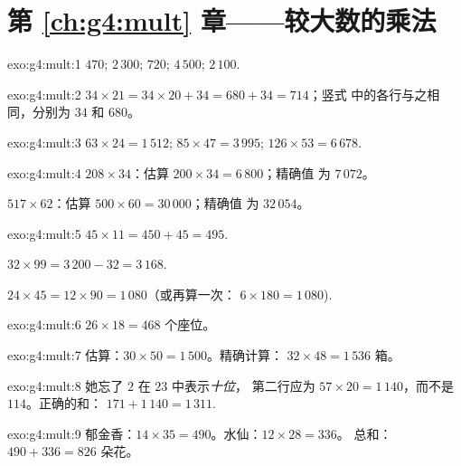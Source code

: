 \section*{第 \ref{ch:g4:mult} 章——较大数的乘法}

\begin{solution}{exo:g4:mult:1}
$470$; \quad $2\,300$; \quad $720$; \quad $4\,500$; \quad
$2\,100$.
\end{solution}

\begin{solution}{exo:g4:mult:2}
$34 \times 21 = 34 \times 20 + 34 = 680 + 34 = 714$；竖式
中的各行与之相同，分别为 $34$ 和 $680$。
\end{solution}

\begin{solution}{exo:g4:mult:3}
$63 \times 24 = 1\,512$; \quad
$85 \times 47 = 3\,995$; \quad
$126 \times 53 = 6\,678$.
\end{solution}

\begin{solution}{exo:g4:mult:4}
$208 \times 34$：估算 $200 \times 34 = 6\,800$；精确值
为 $7\,072$。

$517 \times 62$：估算 $500 \times 60 = 30\,000$；精确值
为 $32\,054$。
\end{solution}

\begin{solution}{exo:g4:mult:5}
$45 \times 11 = 450 + 45 = 495$.

$32 \times 99 = 3\,200 - 32 = 3\,168$.

$24 \times 45 = 12 \times 90 = 1\,080$（或再算一次：
$6 \times 180 = 1\,080$).
\end{solution}

\begin{solution}{exo:g4:mult:6}
$26 \times 18 = 468$ 个座位。
\end{solution}

\begin{solution}{exo:g4:mult:7}
估算：$30 \times 50 = 1\,500$。精确计算：
$32 \times 48 = 1\,536$ 箱。
\end{solution}

\begin{solution}{exo:g4:mult:8}
她忘了 $2$ 在 $23$ 中表示\emph{十位}，
第二行应为 $57 \times 20 = 1\,140$，而不是 $114$。正确的和：
$171 + 1\,140 = 1\,311$.
\end{solution}

\begin{solution}{exo:g4:mult:9}
郁金香：$14 \times 35 = 490$。水仙：$12 \times 28 = 336$。
总和：$490 + 336 = 826$ 朵花。
\end{solution}

